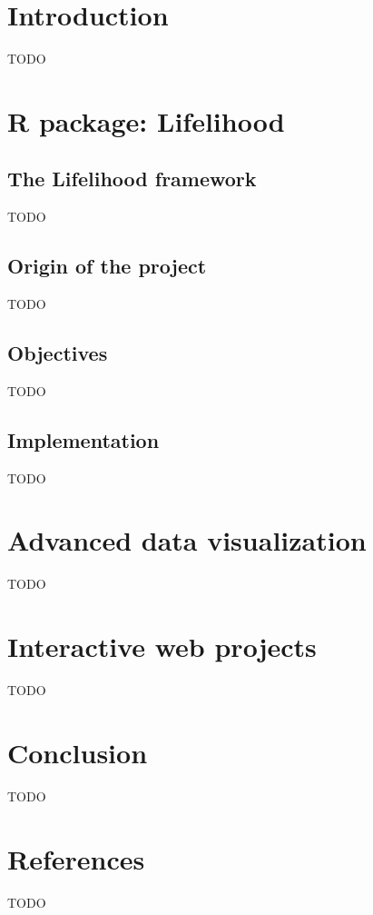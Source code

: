\documentclass[
]{article}
\begin{document}
\newpage

\hypertarget{introduction}{%
\section{Introduction}\label{introduction}}

TODO

\newpage

\hypertarget{r-package-lifelihood}{%
\section{R package: Lifelihood}\label{r-package-lifelihood}}

\hypertarget{the-lifelihood-framework}{%
\subsection{The Lifelihood framework}\label{the-lifelihood-framework}}

TODO

\hypertarget{origin-of-the-project}{%
\subsection{Origin of the project}\label{origin-of-the-project}}

TODO

\hypertarget{objectives}{%
\subsection{Objectives}\label{objectives}}

TODO

\hypertarget{implementation}{%
\subsection{Implementation}\label{implementation}}

TODO

\newpage

\hypertarget{advanced-data-visualization}{%
\section{Advanced data
visualization}\label{advanced-data-visualization}}

TODO

\newpage

\hypertarget{interactive-web-projects}{%
\section{Interactive web projects}\label{interactive-web-projects}}

TODO

\newpage

\hypertarget{conclusion}{%
\section{Conclusion}\label{conclusion}}

TODO

\newpage

\hypertarget{references}{%
\section{References}\label{references}}

TODO
\end{document}
